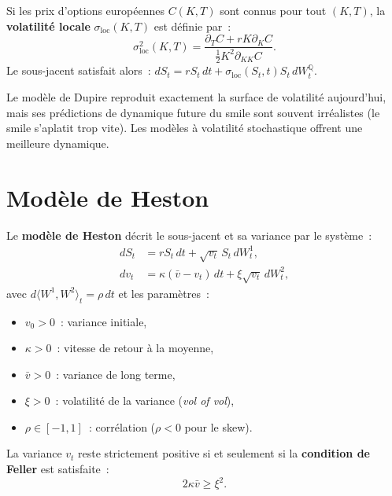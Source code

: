 \begin{theoreme}
Si les prix d'options europ\'eennes $C(K,T)$ sont connus pour tout $(K,T)$,
la \textbf{volatilit\'e locale} $\sigma_{\text{loc}}(K,T)$ est d\'efinie
par~:
\[
    \sigma_{\text{loc}}^2(K,T) = \frac{\partial_T C + rK\partial_K C}
    {\frac{1}{2}K^2\partial_{KK}C}.
\]
Le sous-jacent satisfait alors~:
$dS_t = rS_t\,dt + \sigma_{\text{loc}}(S_t, t)S_t\,dW_t^\mathbb{Q}$.
\end{theoreme}

\begin{attention}[title=\textbf{Limites de la volatilit\'e locale}]
Le mod\`ele de Dupire reproduit exactement la surface de volatilit\'e
aujourd'hui, mais ses pr\'edictions de dynamique future du smile sont
souvent irr\'ealistes (le smile s'aplatit trop vite). Les mod\`eles
\`a volatilit\'e stochastique offrent une meilleure dynamique.
\end{attention}

\section{Mod\`ele de Heston}

\begin{definition}
Le \textbf{mod\`ele de Heston} d\'ecrit le sous-jacent et sa variance
par le syst\`eme~:
\begin{align}
    dS_t &= rS_t\,dt + \sqrt{v_t}\,S_t\,dW_t^1, \\
    dv_t &= \kappa(\bar{v} - v_t)\,dt + \xi\sqrt{v_t}\,dW_t^2,
\end{align}
avec $d\langle W^1, W^2\rangle_t = \rho\,dt$ et les param\`etres~:
\begin{itemize}
    \item $v_0 > 0$~: variance initiale,
    \item $\kappa > 0$~: vitesse de retour \`a la moyenne,
    \item $\bar{v} > 0$~: variance de long terme,
    \item $\xi > 0$~: volatilit\'e de la variance (\textit{vol of vol}),
    \item $\rho \in [-1,1]$~: corr\'elation ($\rho < 0$ pour le skew).
\end{itemize}
\end{definition}

\begin{theoreme}
La variance $v_t$ reste strictement positive si et seulement si
la \textbf{condition de Feller} est satisfaite~:
\[
    2\kappa\bar{v} \geq \xi^2.
\]
\end{theoreme}

